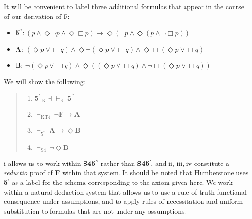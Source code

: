 \documentclass[11pt]{article}
\begin{document}
It will be convenient to label three additional formulas that appear in the course of our derivation of F:
\begin{itemize}[label={}]
\setlength\itemsep{.3 pt}
\item{\textbf{5}$^{\prime\prime}\!: (p \wedge \Diamond\neg p \wedge \Diamond\Box p) \rightarrow \Diamond(\neg p \wedge \Diamond(p\wedge \neg \Box p))$}
\item{\textbf{A}: $(\Diamond{p}\vee \Box q) \wedge \Diamond\neg (\Diamond{p}\vee \Box q) \wedge \Diamond\Box (\Diamond{p}\vee \Box q)$}
\item{\textbf{B}: $\neg (\Diamond{p}\vee \Box q) \wedge \Diamond((\Diamond{p}\vee \Box q) \wedge \neg \Box (\Diamond{p}\vee \Box q))$}
\end{itemize}
We will show the following:
\begin{theorem}
\end{theorem}
\begin{quote}
\begin{enumerate}[label=(\roman*)]
\renewcommand {\theenumi} {\roman{enumi}}
\setlength\itemsep{.3 pt}
\item{\textbf{5}$^{\prime}~_{\text{K}}\!{\dashv}{\vdash}_\text{K}~\textbf{5}^{\prime\prime}$}
\item{$\vdash_\text{KT4} ~ \neg \textbf{F}\rightarrow \textbf{A}$ }
\item{$\vdash_{\text{5}^{\prime\prime}} ~\textbf{A}\rightarrow \Diamond\textbf{B}$ }
\item{$\vdash_\text{S4} ~\neg \Diamond\textbf{B}$ }
\end{enumerate}
\end{quote}
i allows us to work within \textbf{S45}$^{\prime\prime}$ rather than \textbf{S45}$^\prime$, and ii, iii, iv constitute a \textit{reductio} proof of \textbf{F} within that system. It should be noted that Humberstone uses \textbf{5}$^\prime$ as a label for the schema corresponding to the axiom given here. We work within a natural deduction system that allows us to use a rule of truth-functional consequence under assumptions, and to apply rules of necessitation and uniform substitution to formulas that are not under any assumptions.
\end{document}
